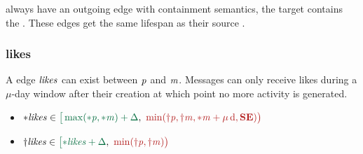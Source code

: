 \tComments always have an outgoing \tReplyOf edge with containment semantics, \ie the target \tMessage contains the \tComment. These edges get the same lifespan as their source \tComment.

\subsubsection{likes}
\label{sec:likes}

A \tLikes edge $\mathit{likes}$ can exist between \tPerson $\mathit{p}$ and \tMessage $\mathit{m}$. Messages can only receive likes during a $\mu$-day window after their creation at which point no more activity is generated.

\begin{itemize}
    \item $\varc{\eLikes} \in \interval{\max(\varc{\ePerson}, \varc{\eMessage}) + \Delta}{\min (\vard{\ePerson}, \vard{\eMessage}, \varc{\eMessage} + \mu\textrm{\,d}, \xSE)}$
    \item $\vard{\eLikes} \in \interval{\varc{\eLikes} + \Delta}{\min (\vard{\ePerson}, \vard{\eMessage})}$
\end{itemize}
